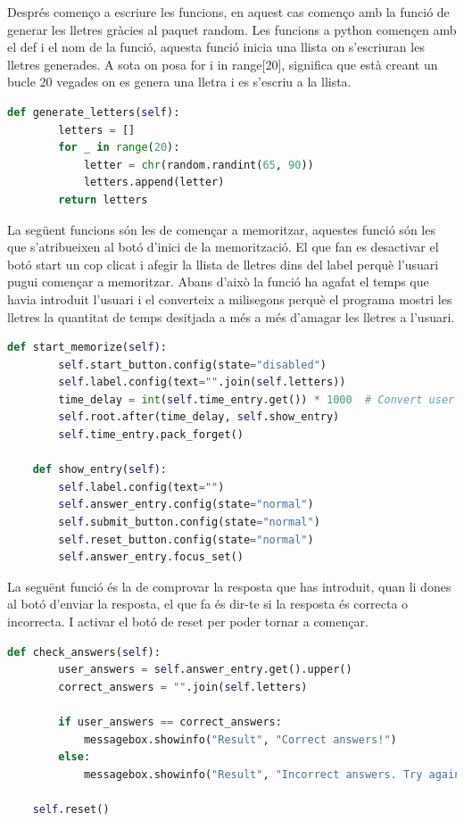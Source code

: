 Després començo a escriure les funcions, en aquest cas començo amb la funció de generar les lletres gràcies al paquet random. Les funcions a python començen amb el def i el nom de la funció, aquesta funció inicia una llista on s'escriuran les lletres generades. A sota on posa for i in range[20], significa que està creant un bucle 20 vegades on es genera una lletra i es s'escriu a la llista.

\begin{lstlisting}[language=Python, style=colorEX, caption=Funció per generar lletres]
    def generate_letters(self):
        letters = []
        for _ in range(20):
            letter = chr(random.randint(65, 90))
            letters.append(letter)
        return letters
\end{lstlisting}

La següent funcions són les de començar a memoritzar, aquestes funció són les que s'atribueixen al botó d'inici de la memorització. El que fan es desactivar el botó start un cop clicat i afegir la llista de lletres dins del label perquè l'usuari pugui començar a memoritzar. Abans d'això la funció ha agafat el temps que havia introduit l'usuari i el converteix a milisegons perquè el programa mostri les lletres la quantitat de temps desitjada a més a més d'amagar les lletres a l'usuari.

\begin{lstlisting}[language=Python, style=colorEX, caption=Funcions pel botó d'inici]
    def start_memorize(self):
        self.start_button.config(state="disabled")
        self.label.config(text="".join(self.letters))
        time_delay = int(self.time_entry.get()) * 1000  # Convert user seconds to milliseconds
        self.root.after(time_delay, self.show_entry)
        self.time_entry.pack_forget()

    def show_entry(self):
        self.label.config(text="")
        self.answer_entry.config(state="normal")
        self.submit_button.config(state="normal")
        self.reset_button.config(state="normal")
        self.answer_entry.focus_set()
\end{lstlisting}

La seguënt funció és la de comprovar la resposta que has introduit, quan li dones al botó d'enviar la resposta, el que fa és dir-te si la resposta és correcta o incorrecta. I activar el botó de reset per poder tornar a començar.

\begin{lstlisting}[language=Python, style=colorEX, caption=Funció per comprovar la resposta]
    def check_answers(self):
        user_answers = self.answer_entry.get().upper()
        correct_answers = "".join(self.letters)

        if user_answers == correct_answers:
            messagebox.showinfo("Result", "Correct answers!")
        else:
            messagebox.showinfo("Result", "Incorrect answers. Try again.")

    self.reset()
\end{lstlisting}

